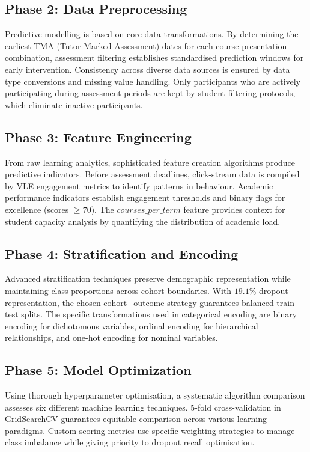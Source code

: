 \documentclass[ %
                    author={Carlos Duran Calle},
                supervisor={Dr. Felipe Campelo},
                    degree={MSc},
                     title={Comparative Machine Learning Analysis for Student Dropout Prediction in a Virtual Learning Environment},
                  subtitle={Incorporating Student Engagement and Socio-Economic Features},
                      type={},
                      year={2025}]{dissertation}
\begin{document}
\subsection{Phase 2: Data Preprocessing}
Predictive modelling is based on core data transformations. By determining the earliest TMA (Tutor Marked Assessment) dates for each course-presentation combination, assessment filtering establishes standardised prediction windows for early intervention. Consistency across diverse data sources is ensured by data type conversions and missing value handling. Only participants who are actively participating during assessment periods are kept by student filtering protocols, which eliminate inactive participants.

\subsection{Phase 3: Feature Engineering}
From raw learning analytics, sophisticated feature creation algorithms produce predictive indicators. Before assessment deadlines, click-stream data is compiled by VLE engagement metrics to identify patterns in behaviour. Academic performance indicators establish engagement thresholds and binary flags for excellence (scores $\geq70$). The $courses\_per\_term$ feature provides context for student capacity analysis by quantifying the distribution of academic load.

\subsection{Phase 4: Stratification and Encoding}
Advanced stratification techniques preserve demographic representation while maintaining class proportions across cohort boundaries. With $19.1\%$ dropout representation, the chosen cohort+outcome strategy guarantees balanced train-test splits. The specific transformations used in categorical encoding are binary encoding for dichotomous variables, ordinal encoding for hierarchical relationships, and one-hot encoding for nominal variables.

\subsection{Phase 5: Model Optimization}
Using thorough hyperparameter optimisation, a systematic algorithm comparison assesses six different machine learning techniques. 5-fold cross-validation in GridSearchCV guarantees equitable comparison across various learning paradigms. Custom scoring metrics use specific weighting strategies to manage class imbalance while giving priority to dropout recall optimisation.
\end{document}
